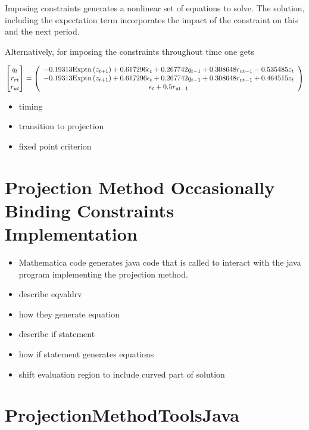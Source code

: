 \documentclass[12pt]{article}
\begin{document}
Imposing constraints generates a nonlinear set of equations to solve.
The solution, including the expectation term incorporates the impact of the
constraint on this and the next period.

Alternatively, for imposing the constraints throughout time one gets

\begin{gather*}
\begin{bmatrix} q_t\\r_{rt}\\r_{ut} \end{bmatrix}=    \left(
   \begin{array}{c}
    -0.19313 \text{Exptn}\left(z_{t+1}\right)+0.617296 \epsilon _t+0.267742
      q_{t-1}+0.308648 r_{\text{ut}-1}-0.535485 z_t \\
    -0.19313 \text{Exptn}\left(z_{t+1}\right)+0.617296 \epsilon _t+0.267742
      q_{t-1}+0.308648 r_{\text{ut}-1}+0.464515 z_t \\
    \epsilon _t+0.5 r_{\text{ut}-1}
   \end{array}
   \right)
\end{gather*}
\begin{itemize}
\item timing
\item transition to projection
\item fixed point criterion
\end{itemize}
\section{Projection Method Occasionally Binding Constraints Implementation}
\label{sec:proj-meth-occass}
\begin{itemize}
\item Mathematica code generates java code that is called to interact with the java program implementing the projection method.
\item describe eqvaldrv
\item how they generate equation
\item describe if statement
\item how if statement generates equations
\item shift evaluation region to include curved part of solution
\end{itemize}


\appendix
\section{ProjectionMethodToolsJava}
\label{sec:proj}



\end{document}
